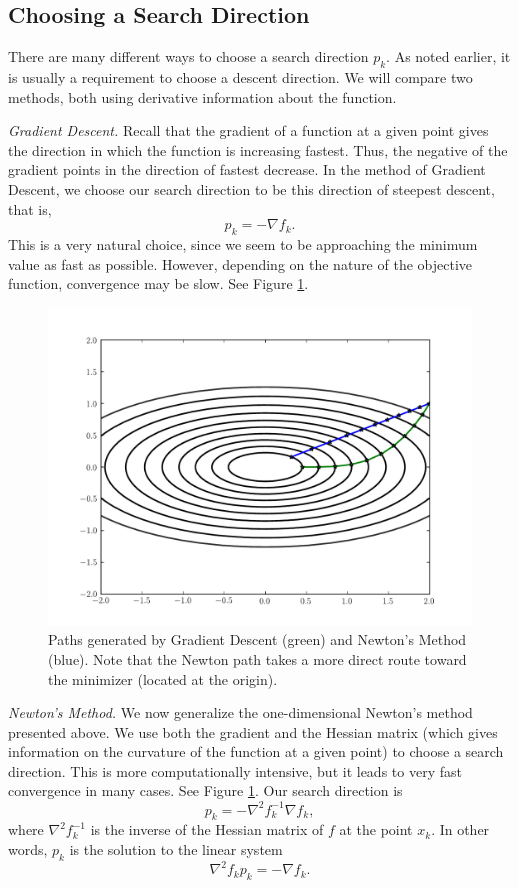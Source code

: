 \subsection*{Choosing a Search Direction}
There are many different ways to choose a search direction $p_k$. As noted earlier, it is usually
a requirement to choose a descent direction. We will compare two methods, both using derivative
information about the function.

\emph{Gradient Descent.} Recall that the gradient of a function at a given point gives the direction
in which the function is increasing fastest. Thus, the negative of the gradient points in the direction
of fastest decrease. In the method of Gradient Descent, we choose our search direction to be
this direction of steepest descent, that is,
$$
p_k = -\nabla f_k.
$$
This is a very natural choice, since we seem to be approaching the minimum value as fast as possible.
However, depending on the nature of the objective function, convergence may be slow. See Figure
\ref{linesearch:comparison}.

\begin{figure}
\centering
\includegraphics[width=\textwidth]{comparison.pdf}
\caption{Paths generated by Gradient Descent (green) and Newton's Method (blue).
Note that the Newton path takes a more direct route toward the minimizer (located
at the origin).
}
\label{linesearch:comparison}
\end{figure}

\emph{Newton's Method.} We now generalize the one-dimensional Newton's method presented above.
We use both the gradient and the Hessian matrix (which gives information on the curvature of the
function at a given point) to choose a search direction. This is more computationally intensive,
but it leads to very fast convergence in many cases. See Figure
\ref{linesearch:comparison}. Our search direction is
$$
p_k = -\nabla^2 f_k^{-1} \nabla f_k,
$$
where $\nabla^2 f_k^{-1}$ is the inverse of the Hessian matrix of $f$ at the point $x_k$.
In other words, $p_k$ is the solution to the linear system
$$
\nabla^2 f_k p_k = -\nabla f_k.
$$

